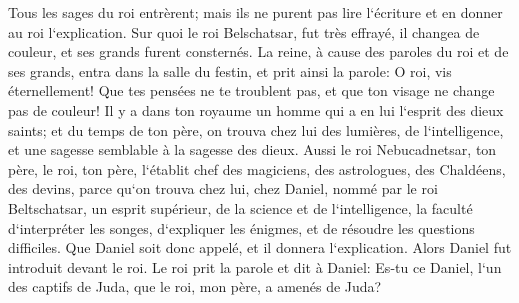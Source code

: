 \verse Tous les sages du roi entrèrent; mais ils ne purent pas lire l`écriture et en donner au roi l`explication. 
\verse Sur quoi le roi Belschatsar, fut très effrayé, il changea de couleur, et ses grands furent consternés. 
\verse La reine, à cause des paroles du roi et de ses grands, entra dans la salle du festin, et prit ainsi la parole: O roi, vis éternellement! Que tes pensées ne te troublent pas, et que ton visage ne change pas de couleur! 
\verse Il y a dans ton royaume un homme qui a en lui l`esprit des dieux saints; et du temps de ton père, on trouva chez lui des lumières, de l`intelligence, et une sagesse semblable à la sagesse des dieux. Aussi le roi Nebucadnetsar, ton père, le roi, ton père, l`établit chef des magiciens, des astrologues, des Chaldéens, des devins, 
\verse parce qu`on trouva chez lui, chez Daniel, nommé par le roi Beltschatsar, un esprit supérieur, de la science et de l`intelligence, la faculté d`interpréter les songes, d`expliquer les énigmes, et de résoudre les questions difficiles. Que Daniel soit donc appelé, et il donnera l`explication. 
\verse Alors Daniel fut introduit devant le roi. Le roi prit la parole et dit à Daniel: Es-tu ce Daniel, l`un des captifs de Juda, que le roi, mon père, a amenés de Juda? 

